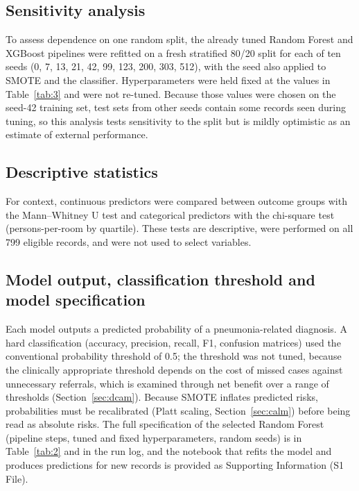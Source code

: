 \documentclass[a4paper,fleqn]{cas-dc}
\begin{document}
\subsection{Sensitivity analysis}

To assess dependence on one random split, the already tuned Random Forest and XGBoost pipelines were refitted on a fresh stratified 80/20 split for each of ten seeds (0, 7, 13, 21, 42, 99, 123, 200, 303, 512), with the seed also applied to SMOTE and the classifier. Hyperparameters were held fixed at the values in Table~\ref{tab:3} and were not re-tuned. Because those values were chosen on the seed-42 training set, test sets from other seeds contain some records seen during tuning, so this analysis tests sensitivity to the split but is mildly optimistic as an estimate of external performance.

\subsection{Descriptive statistics}

For context, continuous predictors were compared between outcome groups with the Mann--Whitney U test and categorical predictors with the chi-square test (persons-per-room by quartile). These tests are descriptive, were performed on all 799 eligible records, and were not used to select variables.

\subsection{Model output, classification threshold and model specification}
\label{sec:output}

Each model outputs a predicted probability of a pneumonia-related diagnosis. A hard classification (accuracy, precision, recall, F1, confusion matrices) used the conventional probability threshold of 0.5; the threshold was not tuned, because the clinically appropriate threshold depends on the cost of missed cases against unnecessary referrals, which is examined through net benefit over a range of thresholds (Section~\ref{sec:dcam}). Because SMOTE inflates predicted risks, probabilities must be recalibrated (Platt scaling, Section~\ref{sec:calm}) before being read as absolute risks. The full specification of the selected Random Forest (pipeline steps, tuned and fixed hyperparameters, random seeds) is in Table~\ref{tab:2} and in the run log, and the notebook that refits the model and produces predictions for new records is provided as Supporting Information (S1 File).
\end{document}
